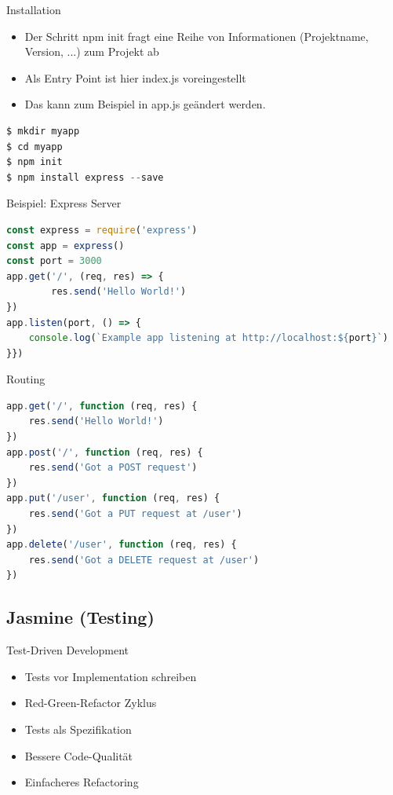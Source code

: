 \begin{KR}{Installation}
\begin{itemize}
  \item Der Schritt npm init fragt eine Reihe von Informationen (Projektname, Version, ...) zum Projekt ab
  \item Als Entry Point ist hier index.js voreingestellt
  \item Das kann zum Beispiel in app.js geändert werden.
\end{itemize}
\begin{lstlisting}[language=JavaScript, style=basesmol]
$ mkdir myapp
$ cd myapp
$ npm init
$ npm install express --save
\end{lstlisting}
\end{KR}

\begin{code}{Beispiel: Express Server}
\begin{lstlisting}[language=JavaScript, style=basesmol]
const express = require('express')
const app = express()
const port = 3000
app.get('/', (req, res) => {
        res.send('Hello World!')
})
app.listen(port, () => {
    console.log(`Example app listening at http://localhost:${port}`)
}})
\end{lstlisting}
\end{code}

\begin{KR}{Routing}
\begin{lstlisting}[language=JavaScript, style=basesmol]
app.get('/', function (req, res) {
    res.send('Hello World!')
})
app.post('/', function (req, res) {
    res.send('Got a POST request')
})
app.put('/user', function (req, res) {
    res.send('Got a PUT request at /user')
})
app.delete('/user', function (req, res) {
    res.send('Got a DELETE request at /user')
})
\end{lstlisting}
\end{KR}

\columnbreak

\subsection{Jasmine (Testing)}

\begin{concept}{Test-Driven Development}
    \begin{itemize}
        \item Tests vor Implementation schreiben
        \item Red-Green-Refactor Zyklus
        \item Tests als Spezifikation
        \item Bessere Code-Qualität
        \item Einfacheres Refactoring
    \end{itemize}
\end{concept}

